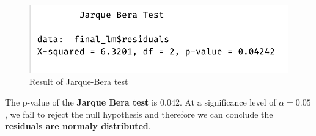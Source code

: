 \begin{figure}[H]
	\centering
	\includegraphics{figures/models/jarque-bera_test.png}
	\caption{Result of Jarque-Bera test}
	\label{fig:jarque-bera-test}
\end{figure}

The p-value of the \textbf{Jarque Bera test} is $0.042$. At a significance level of $\alpha = 0.05$, we fail to reject the null hypothesis and therefore we can conclude the \textbf{residuals are normaly distributed}. 